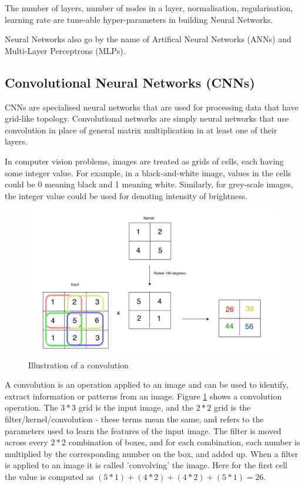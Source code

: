 The number of layers, number of nodes in a layer, normalisation, regularisation, learning rate are tune-able hyper-parameters in building Neural Networks.



Neural Networks also go by the name of Artifical Neural Networks (ANNs) and Multi-Layer Perceptrons (MLPs).

\subsection{Convolutional Neural Networks (CNNs)}
CNNs are specialised neural networks that are used for processing data that have grid-like topology. Convolutional networks are simply neural networks that use convolution in place of general matrix multiplication in at least one of their layers.

In computer vision problems, images are treated as grids of cells, each having some integer value. For example, in a black-and-white image, values in the cells could be 0 meaning black and 1 meaning white. Similarly, for grey-scale images, the integer value could be used for denoting intensity of brightness.

\begin{figure}
    \centering
    \includegraphics[height=0.2\paperheight]{Figures/CNN_explain.png}
    \caption[Convolution diagram]{Illustration of a convolution
    \cite{noauthor_convolutional_nodate}}
    \label{fig:convolution_diagram}
\end{figure}


A convolution is an operation applied to an image and can be used to identify, extract information or patterns from an image. Figure \ref{fig:convolution_diagram} shows a convolution operation. The \(3 * 3\)  grid is the input image, and the \(2 * 2\) grid is the filter/kernel/convolution - these terms mean the same, and refers to the parameters used to learn the features of the input image. The filter is moved across every \(2 * 2\) combination of boxes, and for each combination, each number is multiplied by the corresponding number on the box, and added up. When a filter is applied to an image it is called 'convolving' the image. Here for the first cell the value is computed as \( (5*1)+(4*2)+(4*2)+(5*1) = 26\).

